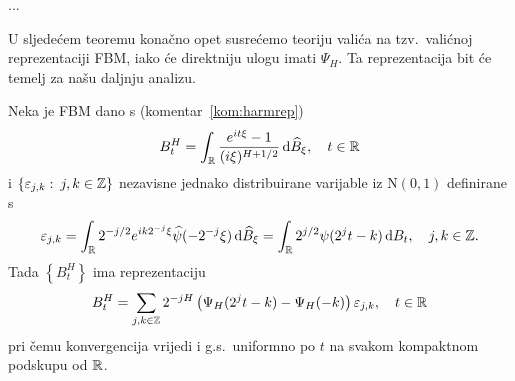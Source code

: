 \documentclass[main.tex]{subfiles}
\begin{document}
\begin{komentar}\label{kom:Psi}
	...
\end{komentar}

U sljedećem teoremu konačno opet susrećemo teoriju valića na tzv.\ valićnoj
reprezentaciji FBM, iako će direktniju ulogu imati \( \Psi_H \).
Ta reprezentacija bit će temelj za našu daljnju analizu.

\begin{teorem}\label{holpo-teorem1}
	Neka je FBM dano s (komentar~\ref{kom:harmrep})
	\begin{equation}
		B^H_t = \int_{\mathbb{R}} \frac{e^{it\xi}-1}{(i\xi)^{H+1/2}} \,\mathrm d \widehat{B}_\xi, \quad t \in \mathbb{R}
	\end{equation}
	i
	\( \left\{ \varepsilon_{j,k} \, \colon \, j,k \in \mathbb{Z} \right\} \)
	nezavisne jednako distribuirane varijable iz \( \mathrm N(0,1) \) definirane s
	\begin{equation}\label{eq:defepsjk}
		\varepsilon_{j,k} =
		\int_{\mathbb{R}} 2^{-j/2}e^{ik2^{-j}\xi}\widehat{\psi}(-2^{-j}\xi)\,\mathrm d \widehat{B}_\xi =
		\int_{\mathbb{R}} 2^{j/2} \psi(2^jt-k) \,\mathrm d B_t, \quad j,k\in \mathbb{Z}.
	\end{equation}
	Tada \( \left\{ B^H_t  \right\} \) ima reprezentaciju
	\begin{equation}\label{eq:valfbmrep}
		B^H_t = \sum_{j,k \in \mathbb{Z}}
		2^{-jH} \left( \Psi_H(2^jt - k) - \Psi_H(-k)  \right) \varepsilon_{j,k}, \quad t \in \mathbb{R}
	\end{equation}
	pri čemu konvergencija vrijedi i g.s.\ uniformno po \( t \) na svakom
	kompaktnom podskupu od \( \mathbb{R} \).
\end{teorem}
\end{document}
